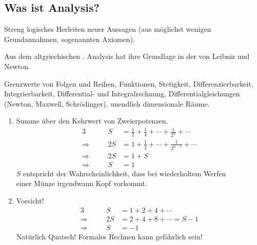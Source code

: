 \documentclass[../ana1.tex]{subfiles}
\begin{document}
\setcounter{section}{0}

\begin{prosa}

\section{Was ist Analysis?}

\begin{description}[style=nextline]
	\item[Mathematik]
		Streng logisches Herleiten neuer Aussagen (aus möglichst wenigen\\ Grundannahmen, sogenannten Axiomen).
	\item[Analysis]
		Aus dem altgriechischen . Analysis hat ihre Grundlage in der  von Leibniz und Newton.
	\item[Zentrale Begriffe]
		Grenzwerte von Folgen und Reihen, Funktionen, Stetigkeit, Differenzierbarkeit, Integrierbarkeit, Differential- und Integralrechnung, Differentialgleichungen
		(Newton, Maxwell, Schrödinger), unendlich dimensionale Räume.
\end{description}

\begin{bspe}\leavevmode
	\begin{enumerate}[(1)]
		\item Summe über den Kehrwert von Zweierpotenzen.
			\begin{alignat*}{3}
							   &&             S &= \frac{1}{2} + \frac{1}{4} + \cdots + \frac{1}{2^{n}} + \cdots \\
				\Longrightarrow&\quad& 		 2S &= 1 + \frac{1}{2} + \cdots + \frac{1}{2^{n-1}} + \cdots \\
				\Longrightarrow&\quad& 	     2S &= 1 + S \\
				\Longrightarrow&&             S &= 1
			\end{alignat*}
			\(S\) entspricht der Wahrscheinlichkeit, dass bei wiederholtem Werfen \\
			einer Münze irgendwann Kopf vorkommt.\\
		\item Vorsicht!
			\begin{alignat*}{3}
							   &&       S &= 1 + 2 + 4 + \cdots \\
				\Longrightarrow&\quad& 2S &= 2 + 4 + 8 + \cdots = S - 1\\
				\Longrightarrow&\quad&  S &= \minus 1
			\end{alignat*}
			Natürlich Quatsch! Formales Rechnen kann gefährlich sein!
	\end{enumerate}
\end{bspe}


\end{prosa}
\end{document}
